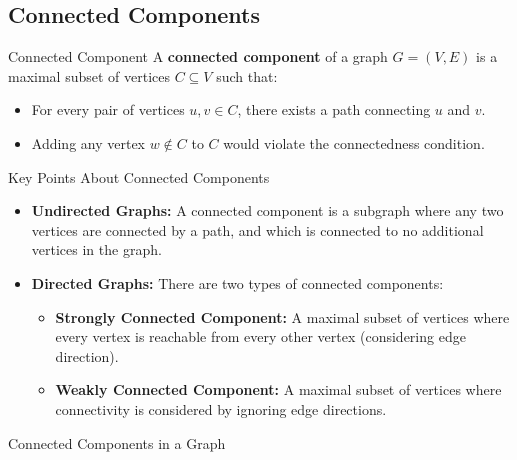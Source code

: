 \newpage
\subsection{Connected Components}
\begin{definition}[]{Connected Component}
    A \textbf{connected component} of a graph $G = (V, E)$ is a maximal subset of vertices $C \subseteq V$ such that:
    \begin{itemize}
        \item For every pair of vertices $u, v \in C$, there exists a path connecting $u$ and $v$.
        \item Adding any vertex $w \notin C$ to $C$ would violate the connectedness condition.
    \end{itemize}
\end{definition}

\begin{remarks}[]{Key Points About Connected Components}
    \begin{itemize}
        \item \textbf{Undirected Graphs:} A connected component is a subgraph where any two vertices are connected by a path, and which is connected to no additional vertices in the graph.
        \item \textbf{Directed Graphs:} There are two types of connected components:
              \begin{itemize}
                  \item \textbf{Strongly Connected Component:} A maximal subset of vertices where every vertex is reachable from every other vertex (considering edge direction).
                  \item \textbf{Weakly Connected Component:} A maximal subset of vertices where connectivity is considered by ignoring edge directions.
              \end{itemize}
    \end{itemize}
\end{remarks}

\begin{example}[]{Connected Components in a Graph}
    \begin{center}
    \end{center}
\end{example}

